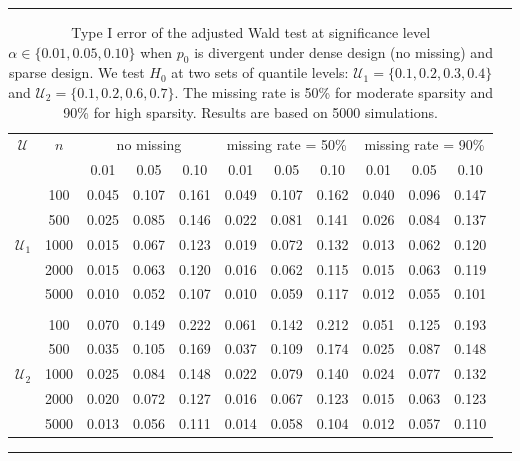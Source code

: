 \documentclass[times,sort&compress,3p]{elsarticle}
\theoremstyle{plain}%
\theoremstyle{definition}
\begin{document}
\begin{table}[ht]
	\centering
	\caption{Type I error of the adjusted Wald test at significance level $\alpha \in \{0.01, 0.05, 0.10\}$ when $p_0$ is divergent under dense design (no missing) and sparse design. We test $H_0$ at two sets of quantile levels: $\mathcal{U}_1 =
\{0.1, 0.2, 0.3, 0.4\}$ and $\mathcal{U}_2 = \{0.1, 0.2, 0.6, 0.7\}$. The missing rate is 50\% for moderate sparsity and 90\% for high sparsity.  Results are based on 5000 simulations. 
	} 
	\label{table:typeI.r2} 
	\hrule
	\begin{tabular}{ccccccccccc}
		$\mathcal{U}$  & $n$ & \multicolumn{3}{c}{no missing} & \multicolumn{3}{c}{missing rate = 50\%}  &  \multicolumn{3}{c}{missing rate = 90\%}  \\ 
		& & 0.01 & 0.05 & 0.10 & 0.01 & 0.05 & 0.10 & 0.01 & 0.05 & 0.10\\ 
	\cmidrule(lr){3-5} \cmidrule(lr){6-8} \cmidrule(lr){9-11}
		\multirow{5}{*}{$\mathcal{U}_1$} 
		& 100 & 0.045 & 0.107 & 0.161 & 0.049 & 0.107 & 0.162 & 0.040 & 0.096 & 0.147 \\ 
		& 500 & 0.025 & 0.085 & 0.146 & 0.022 & 0.081 & 0.141 & 0.026 & 0.084 & 0.137 \\ 
		& 1000 & 0.015 & 0.067 & 0.123 & 0.019 & 0.072 & 0.132 & 0.013 & 0.062 & 0.120 \\ 
		& 2000 & 0.015 & 0.063 & 0.120 & 0.016 & 0.062 & 0.115 & 0.015 & 0.063 & 0.119 \\ 
		& 5000 & 0.010 & 0.052 & 0.107 & 0.010 & 0.059 & 0.117 & 0.012 & 0.055 & 0.101 \\ 
		\\
		\multirow{5}{*}{$\mathcal{U}_2$} 
		& 100 & 0.070 & 0.149 & 0.222 & 0.061 & 0.142 & 0.212 & 0.051 & 0.125 & 0.193 \\ 
		& 500 & 0.035 & 0.105 & 0.169 & 0.037 & 0.109 & 0.174 & 0.025 & 0.087 & 0.148 \\ 
		& 1000 & 0.025 & 0.084 & 0.148 & 0.022 & 0.079 & 0.140 & 0.024 & 0.077 & 0.132 \\ 
		& 2000 & 0.020 & 0.072 & 0.127 & 0.016 & 0.067 & 0.123 & 0.015 & 0.063 & 0.123 \\ 
		& 5000 & 0.013 & 0.056 & 0.111 & 0.014 & 0.058 & 0.104 & 0.012 & 0.057 & 0.110 \\
	\end{tabular}
	\hrule 
\end{table}
\end{document}
